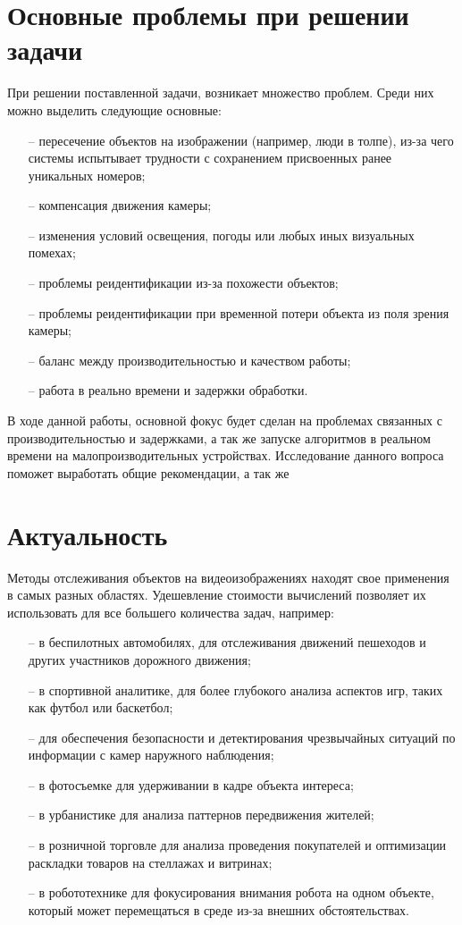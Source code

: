 \section{Основные проблемы при решении задачи}
При решении поставленной задачи, возникает множество проблем. Среди них можно выделить следующие основные:
\begin{itemize}
    \item[--] пересечение объектов на изображении (например, люди в толпе), из-за чего системы испытывает трудности с сохранением присвоенных ранее уникальных номеров;
    \item[--] компенсация движения камеры;
    \item[--] изменения условий освещения, погоды или любых иных визуальных помехах;
    \item[--] проблемы реидентификации из-за похожести объектов;
    \item[--] проблемы реидентификации при временной потери объекта из поля зрения камеры;
    \item[--] баланс между производительностью и качеством работы;
    \item[--] работа в реально времени и задержки обработки.
\end{itemize}

В ходе данной работы, основной фокус будет сделан на проблемах связанных с производительностью и задержками, а так же запуске алгоритмов в реальном времени на малопроизводительных устройствах. Исследование данного вопроса поможет выработать общие рекомендации, а так же 

\section{Актуальность}
Методы отслеживания объектов на видеоизображениях находят свое применения в самых разных областях. 
Удешевление стоимости вычислений позволяет их использовать для все большего количества задач, например:
\begin{itemize}
    \item[--] в беспилотных автомобилях, для отслеживания движений пешеходов и других участников дорожного движения;
    \item[--] в спортивной аналитике, для более глубокого анализа аспектов игр, таких как футбол или баскетбол;
    \item[--] для обеспечения безопасности и детектирования чрезвычайных ситуаций по информации с камер наружного наблюдения;
    \item[--] в фотосъемке для удерживании в кадре объекта интереса;  
    \item[--] в урбанистике для анализа паттернов передвижения жителей;
    \item[--] в розничной торговле для анализа проведения покупателей и оптимизации раскладки товаров на стеллажах и витринах;
    \item[--] в робототехнике для фокусирования внимания робота на одном объекте, который может перемещаться в среде из-за внешних обстоятельствах. 
\end{itemize}

